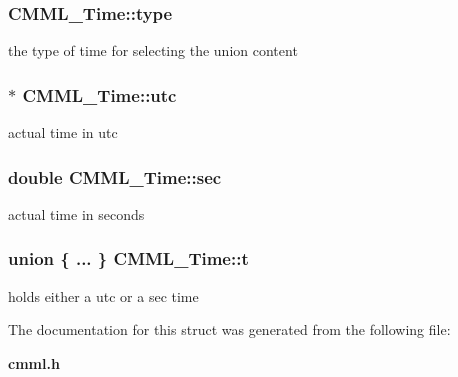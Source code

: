 \subsubsection{ {\bf CMML\_\-Time::type}}\label{structCMML__Time_o1}


the type of time for selecting the union content 
\subsubsection{$\ast$ {\bf CMML\_\-Time::utc}}\label{structCMML__Time_o2}


actual time in utc 
\subsubsection{\setlength{\rightskip}{0pt plus 5cm}double {\bf CMML\_\-Time::sec}}\label{structCMML__Time_o3}


actual time in seconds 
\subsubsection{\setlength{\rightskip}{0pt plus 5cm}union \{ ... \}   {\bf CMML\_\-Time::t}}\label{structCMML__Time_o4}


holds either a utc or a sec time 

The documentation for this struct was generated from the following file:\begin{CompactItemize}
\item 
{\bf cmml.h}\end{CompactItemize}
